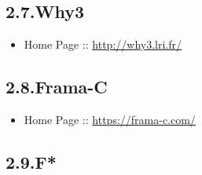 \documentclass[12pt,twoside]{article}
\begin{document}
\subsection{2.7.\hspace*{0.5em}Why3}\label{sec-why3}%

\begin{itemize}[noitemsep,topsep=\mdcompacttopsep]%

\item{}Home Page :: \href{http://why3.lri.fr/}{{\ttfamily http://\hspace{0pt}why3.\hspace{0pt}lri.\hspace{0pt}fr/\hspace{0pt}}}%
\end{itemize}%

\subsection{2.8.\hspace*{0.5em}Frama-C}\label{sec-frama-c}%

\begin{itemize}[noitemsep,topsep=\mdcompacttopsep]%

\item{}Home Page :: \href{https://frama-c.com/}{{\ttfamily https://\hspace{0pt}frama-\hspace{0pt}c.\hspace{0pt}com/\hspace{0pt}}}%
\end{itemize}%

\subsection{2.9.\hspace*{0.5em}F*}\label{sec-f-}%
\end{document}
